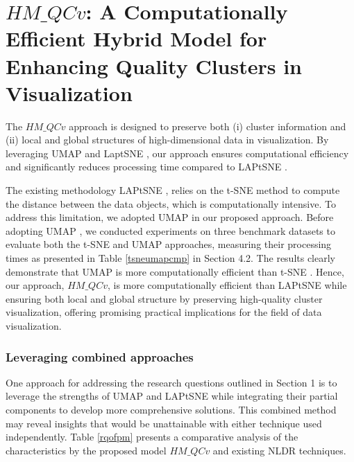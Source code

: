 \chapter{\Large $HM\_QCv$: A Computationally Efficient Hybrid Model for Enhancing Quality Clusters in Visualization}


The $HM\_QCv$ approach is designed to preserve both (i) cluster information and (ii) local and global structures of high-dimensional data in visualization.  By leveraging UMAP \cite{umap_reference} and LaptSNE \cite{sun2023laplacian}, our approach ensures computational efficiency and significantly reduces processing time compared to LAPtSNE \cite{sun2023laplacian}.

The existing methodology LAPtSNE \cite{sun2023laplacian}, relies on the t-SNE \cite{tsne} method to compute the distance between the data objects, which is computationally intensive.  To address this limitation, we adopted UMAP \cite{umap_reference} in our proposed approach.  Before adopting UMAP \cite{umap_reference}, we conducted experiments on three benchmark datasets to evaluate both the t-SNE \cite{tsne} and UMAP \cite{umap_reference} approaches, measuring their processing times as presented in Table \ref{tsneumapcmp} in Section 4.2. The results clearly demonstrate that UMAP \cite{umap_reference} is more computationally efficient than t-SNE \cite{tsne}. Hence, our approach, $HM\_QCv$, is more computationally efficient than LAPtSNE \cite{sun2023laplacian} while ensuring both local and global structure by preserving high-quality cluster visualization, offering promising practical implications for the field of data visualization.



\subsection{Leveraging combined approaches}

One approach for addressing the research questions outlined in Section 1 is to leverage the strengths of UMAP \cite{umap_reference} and LAPtSNE \cite{sun2023laplacian} while integrating their partial components to develop more comprehensive solutions. This combined method may reveal insights that would be unattainable with either technique used independently. Table \ref{rqofpm} presents a comparative analysis of the characteristics by the proposed model $HM\_QCv$ and existing NLDR techniques.



